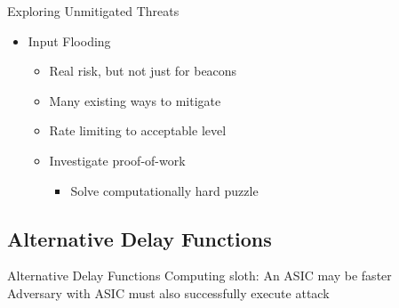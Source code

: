 \begin{frame}{Exploring Unmitigated Threats}
{\begin{multicols}{2}
\begin{itemize}
            \item Input Flooding
            \begin{itemize}
                \item Real risk, but not just for beacons
                \item Many existing ways to mitigate
                \item Rate limiting to acceptable level
                \item Investigate proof-of-work
                \begin{itemize}
                    \item Solve computationally hard puzzle
                \end{itemize}
            \end{itemize}
        \end{itemize}
    \end{multicols}
}\end{frame}


\subsection{Alternative Delay Functions}

\begin{frame}{Alternative Delay Functions}
    \centering
    Computing sloth: An ASIC may be faster
    \\
    \vspace{1cm}
    Adversary with ASIC must also successfully execute attack
\end{frame}

